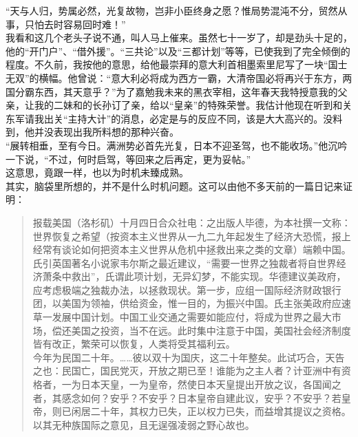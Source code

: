 “天与人归，势属必然，光复故物，岂非小臣终身之愿？惟局势混沌不分，贸然从事，只怕去时容易回时难！”\\

我看和这几个老头子说不通，叫人马上催来。虽然七十一岁了，却是劲头十足的，他的“开门户”、“借外援”。“三共论”以及“三都计划”等等，已使我到了完全倾倒的程度。不久前，我按他的意思，给他最崇拜的意大利首相墨索里尼写了一块“国士无双”的横幅。他曾说：“意大利必将成为西方一霸，大清帝国必将再兴于东方，两国分霸东西，其天意乎？”为了嘉勉我未来的黑衣宰相，这年春天我特授意我的父亲，让我的二妹和的长孙订了亲，给以“皇亲”的特殊荣誉。我估计他现在听到和关东军请我出关“主持大计”的消息，必定是与的反应不同，该是大大高兴的。没料到，他并没表现出我所料想的那种兴奋。\\

“展转相垂，至有今日。满洲势必首先光复，日本不迎圣驾，也不能收场。”他沉吟一下说，“不过，何时启驾，等回来之后再定，更为妥帖。”\\

这意思，竟跟一样，也以为时机未臻成熟。\\

其实，脑袋里所想的，并不是什么时机问题。这可以由他不多天前的一篇日记来证明：\\

\begin{quote}
	报载美国（洛杉矶）十月四日合众社电：之出版人毕德，为本社撰一文称：世界恢复之希望（按资本主义世界从一九二九年起发生了经济大恐慌，报上经常有谈论如何把资本主义世界从危机中拯救出来之类的文章）端赖中国。氏引英国著名小说家韦尔斯之最近建议，“需要一世界之独裁者将自世界经济萧条中救出”，氏谓此项计划，无异幻梦，不能实现。华德建议美政府，应考虑极端之独裁办法，以拯救现状。第一步，应组一国际经济财政银行团，以美国为领袖，供给资金，惟一目的，为振兴中国。氏主张美政府应速草一发展中国计划。中国工业交通之需要如能应付，将成为世界之最大市场，偿还美国之投资，当不在远。此时集中注意于中国，美国社会经济制度皆有改正，繁荣可以恢复，人类将受其福利云。\\

今年为民国二十年。……彼以双十为国庆，这二十年整矣。此试巧合，天告之也：民国亡，国民党灭，开放之期已至！谁能为之主人者？计亚洲中有资格者，一为日本天皇，一为皇帝，然使日本天皇提出开放之议，各国闻之者，其感念如何？安乎？不安乎？日本皇帝自建此议，安乎？不安乎？若皇帝，则已闲居二十年，其权力已失，正以权力已失，而益增其提议之资格。以其无种族国际之意见，且无逞强凌弱之野心故也。\\
\end{quote}

